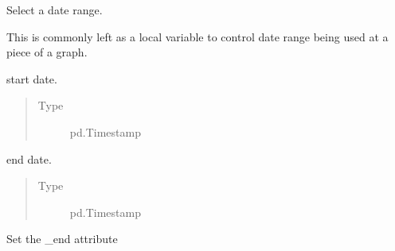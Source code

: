 \documentclass[letterpaper,10pt,english]{sphinxmanual}
\begin{document}
\begin{fulllineitems}
\label{\detokenize{beginners-guide:dalio.pipe.select.DateSelect}}
Select a date range.

This is commonly left as a local variable to control date range being
used at a piece of a graph.

\begin{fulllineitems}
\label{\detokenize{beginners-guide:dalio.pipe.select.DateSelect._start}}
start date.
\begin{quote}\begin{description}
\item[{Type}] \leavevmode
pd.Timestamp

\end{description}\end{quote}

\end{fulllineitems}


\begin{fulllineitems}
\label{\detokenize{beginners-guide:dalio.pipe.select.DateSelect._end}}
end date.
\begin{quote}\begin{description}
\item[{Type}] \leavevmode
pd.Timestamp

\end{description}\end{quote}

\end{fulllineitems}


\begin{fulllineitems}
\label{\detokenize{beginners-guide:dalio.pipe.select.DateSelect.set_end}}
Set the \_end attribute


\end{fulllineitems}
\end{fulllineitems}
\end{document}
